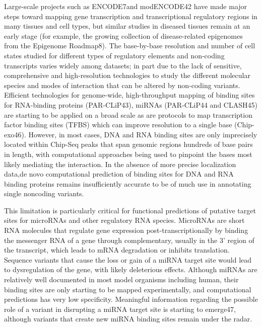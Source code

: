 Large-scale projects such as ENCODE7and modENCODE42 have made major steps toward mapping gene transcription and transcriptional regulatory regions in many tissues and cell types, but similar studies in diseased tissues remain at an early stage (for example, the growing collection of disease-related epigenomes from the Epigenome Roadmap8). The base-by-base resolution and number of cell states studied for different types of regulatory elements and non-coding transcripts varies widely among datasets; in part due to the lack of sensitive, comprehensive and high-resolution technologies to study the different molecular species and modes of interaction that can be altered by non-coding variants. Efficient technologies for genome-wide, high-throughput mapping of binding sites for RNA-binding proteins (PAR-CLiP43), miRNAs (PAR-CLiP44 and CLASH45) are starting to be applied on a broad scale as are protocols to map transcription factor binding sites (TFBS) which can improve resolution to a single base (Chip-exo46). However, in most cases, DNA and RNA binding sites are only imprecisely located within Chip-Seq peaks that span genomic regions hundreds of base pairs in length, with computational approaches being used to pinpoint the bases most likely mediating the interaction. In the absence of more precise localization data,de novo computational prediction of binding sites for DNA and RNA binding proteins remains insufficiently accurate to be of much use in annotating single noncoding variants.

This limitation is particularly critical for functional predictions of putative target sites for microRNAs and other regulatory RNA species. MicroRNAs are short RNA molecules that regulate gene expression post-transcriptionally by binding the messenger RNA of a gene through complementary, usually in the 3’ region of the transcript, which leads to mRNA degradation or inhibits translation. Sequence variants that cause the loss or gain of a miRNA target site would lead to dysregulation of the gene, with likely deleterious effects. Although miRNAs are relatively well documented in most model organisms including human, their binding sites are only starting to be mapped experimentally, and computational predictions has very low specificity. Meaningful information regarding the possible role of a variant in disrupting a miRNA target site is starting to emerge47, although variants that create new miRNA binding sites remain under the radar.


